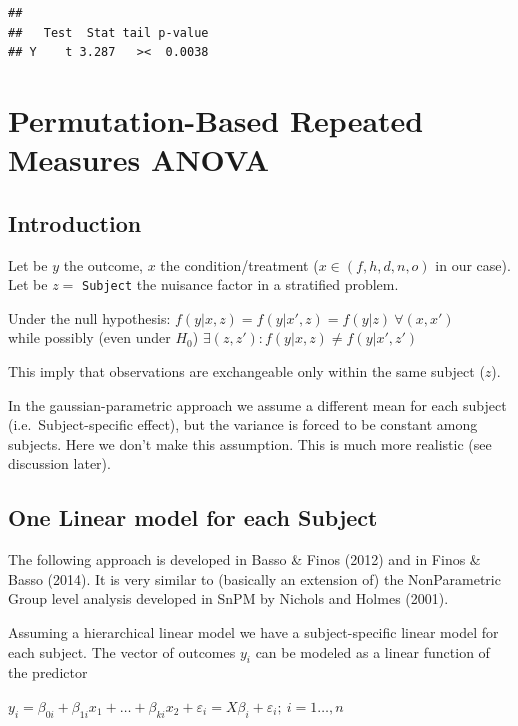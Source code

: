 \documentclass[
]{article}
\begin{document}
\begin{verbatim}
## 
##   Test  Stat tail p-value
## Y    t 3.287   ><  0.0038
\end{verbatim}

\hypertarget{permutation-based-repeated-measures-anova}{%
\section{Permutation-Based Repeated Measures
ANOVA}\label{permutation-based-repeated-measures-anova}}

\hypertarget{introduction-1}{%
\subsection{Introduction}\label{introduction-1}}

Let be \(y\) the outcome, \(x\) the condition/treatment
(\(x\in (f,h,d,n,o)\) in our case). Let be \(z=\) \texttt{Subject} the
nuisance factor in a stratified problem.

Under the null hypothesis:
\(f(y|x,z)=f(y|x',z)=f(y|z) \ \forall (x,x')\)\\
while possibly (even under \(H_0\))
\(\exists (z,z'): f(y|x,z) \neq f(y|x',z')\)

This imply that observations are exchangeable only within the same
subject (\(z\)).

In the gaussian-parametric approach we assume a different mean for each
subject (i.e.~Subject-specific effect), but the variance is forced to be
constant among subjects. Here we don't make this assumption. This is
much more realistic (see discussion later).

\hypertarget{one-linear-model-for-each-subject}{%
\subsection{One Linear model for each
Subject}\label{one-linear-model-for-each-subject}}

The following approach is developed in Basso \& Finos (2012) and in
Finos \& Basso (2014). It is very similar to (basically an extension of)
the NonParametric Group level analysis developed in SnPM by Nichols and
Holmes (2001).

Assuming a hierarchical linear model we have a subject-specific linear
model for each subject. The vector of outcomes \(y_i\) can be modeled as
a linear function of the predictor

\(y_i=\beta_{0i}+\beta_{1i}x_1+\ldots+\beta_{ki}x_2+\varepsilon_i=X\beta_i+\varepsilon_i; \ i=1\ldots,n\)
\end{document}
